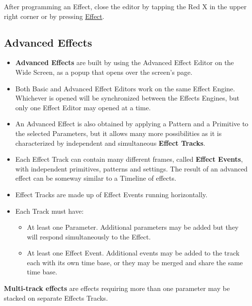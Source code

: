 \documentclass[
]{article}
\providecommand{\tightlist}{%
  \setlength{\itemsep}{0pt}\setlength{\parskip}{0pt}}
\begin{document}
After programming an Effect, close the editor by tapping the Red X in the upper right corner or by pressing \protect\hyperlink{effect}{Effect}.

\hypertarget{Basic-Effects-9.5}{%
\subsection{Advanced Effects}\label{Basic-Effects-9.5}}

\begin{itemize}
\item
  \textbf{Advanced Effects} are built by using the Advanced Effect Editor on the Wide Screen, as a popup that opens over the screen's page.
\item
  Both Basic and Advanced Effect Editors work on the same Effect Engine. Whichever is opened will be synchronized between the Effects Engines, but only one Effect Editor may opened at a time.
\item
  An Advanced Effect is also obtained by applying a Pattern and a Primitive to the selected Parameters, but it allows many more possibilities as it is characterized by independent and simultaneous \textbf{Effect Tracks}.
\item
  Each Effect Track can contain many different frames, called \textbf{Effect Events}, with independent primitives, patterns and settings. The result of an advanced effect can be someway similar to a Timeline of effects.
\end{itemize}

\begin{itemize}
\item
  Effect Tracks are made up of Effect Events running horizontally.
\item
  Each Track must have:

  \begin{itemize}
  \tightlist
  \item
    At least one Parameter. Additional parameters may be added but they will respond simultaneously to the Effect.
  \item
    At least one Effect Event. Additional events may be added to the track each with its own time base, or they may be merged and share the same time base.
  \end{itemize}
\end{itemize}

\textbf{Multi-track effects} are effects requiring more than one parameter may be stacked on separate Effects Tracks.
\end{document}

